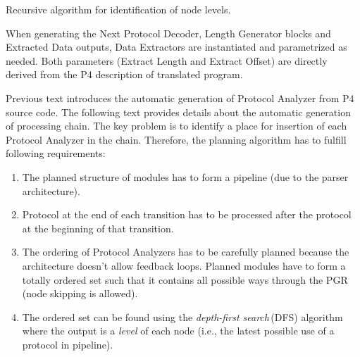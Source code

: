 \begin{algorithm}[t]
    \caption{Recursive algorithm for identification of node levels.}
    \label{alg:longest}
    \SetAlgoLined
\end{algorithm}

When generating the Next Protocol Decoder, Length Generator blocks 
and Extracted Data outputs, Data Extractors are instantiated and parametrized as needed.
Both parameters (Extract Length and Extract Offset) are directly derived from the P4 description of translated program.

Previous text introduces the automatic generation of Protocol Analyzer from P4 source code. 
The following text provides details about the automatic generation of processing chain.
The key problem is to identify a place for insertion of each Protocol Analyzer in the chain. 
Therefore, the planning algorithm has to fulfill following requirements:
\begin{enumerate}
    \item The planned structure of modules has to form a pipeline (due to the parser architecture).
    \item Protocol at the end of each transition has to be processed after the protocol at the beginning of that transition.
    \item The ordering of Protocol Analyzers has to be carefully planned because the architecture doesn't allow feedback loops.
    Planned modules have to form a totally ordered set such that it contains all possible ways through the PGR (node skipping is allowed).
    \item The ordered set can be found using the \textit{depth-first search}\,(DFS) algorithm where the output is a \textit{level} of 
    each node (i.e., the latest possible use of a protocol in pipeline).
\end{enumerate}

